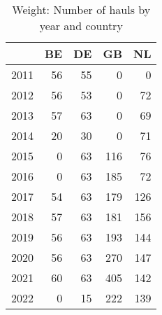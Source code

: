 \begin{table}[ht]
\centering
\begin{tabular}{rrrrr}
  \hline
 & BE & DE & GB & NL \\ 
  \hline
2011 & 56 & 55 & 0 & 0 \\ 
  2012 & 56 & 53 & 0 & 72 \\ 
  2013 & 57 & 63 & 0 & 69 \\ 
  2014 & 20 & 30 & 0 & 71 \\ 
  2015 & 0 & 63 & 116 & 76 \\ 
  2016 & 0 & 63 & 185 & 72 \\ 
  2017 & 54 & 63 & 179 & 126 \\ 
  2018 & 57 & 63 & 181 & 156 \\ 
  2019 & 56 & 63 & 193 & 144 \\ 
  2020 & 56 & 63 & 270 & 147 \\ 
  2021 & 60 & 63 & 405 & 142 \\ 
  2022 & 0 & 15 & 222 & 139 \\ 
   \hline
\end{tabular}
\caption{Weight: Number of hauls by year and country} 
\end{table}
